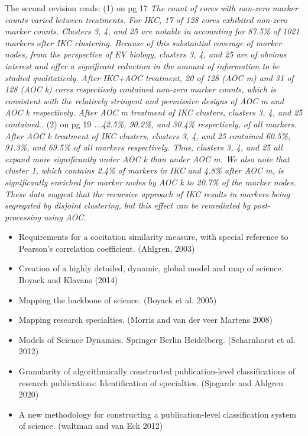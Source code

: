 \documentclass[11pt, oneside]{article}   	%
\begin{document}
The second revision reads: (1) on pg 17 \emph{The count of cores with non-zero marker counts varied between treatments. For IKC, 17 of 128 cores exhibited non-zero marker counts. Clusters 3, 4, and 25 are notable in accounting for 87.5\% of 1021 markers after IKC clustering. Because of this substantial coverage of marker nodes, from the perspective of EV biology, clusters 3, 4, and 25 are of obvious interest and offer a significant reduction in the amount of information to be studied qualitatively.
After IKC+AOC treatment, 20 of 128 (AOC m) and 31 of 128 (AOC k) cores respectively contained non-zero marker counts, which is consistent with the relatively stringent and permissive designs of AOC m and AOC k respectively. After AOC m treatment of IKC clusters, clusters 3, 4, and 25 contained..}
(2) on pg 19 \emph{...42.5\%, 90.2\%, and 30.4\% respectively, of all markers. After AOC k treatment of IKC clusters, clusters 3, 4, and 25 contained 60.5\%, 91.3\%, and 69.5\% of all markers respectively. Thus, clusters 3, 4, and 25 all expand more significantly under AOC k than under AOC m. We also note that cluster 1, which contains 2.4\% of markers in IKC and 4.8\% after AOC m, is significantly enriched for marker nodes by AOC k to 20.7\% of the marker nodes. These data suggest that the recursive approach of IKC results in markers being segregated by disjoint clustering, but this effect can be remediated by post-processing using AOC.}


\begin{itemize}
\item Requirements for a cocitation similarity measure, with special reference to Pearson’s correlation coefficient. (Ahlgren, 2003)
\item Creation of a highly detailed, dynamic, global model and map of science. Boyack and Klavans (2014)
\item Mapping the backbone of science. (Boyack et al. 2005) 
\item Mapping research specialties. (Morris and van der veer Martens 2008)
\item Models of Science Dynamics. Springer Berlin Heidelberg. (Scharnhorst et al. 2012)
\item Granularity of algorithmically constructed publication-level classifications of research publications: Identification of specialties. (Sjogarde and Ahlgren 2020)
\item A new methodology for constructing a publication-level classification system of science. (waltman and van Eck 2012)
\end{itemize}
\end{document}
